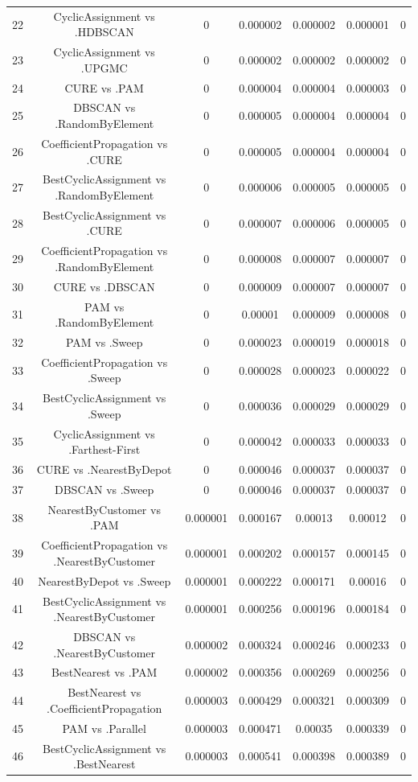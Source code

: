 \documentclass[a4paper,10pt]{article}
\begin{document}
\begin{landscape}
\begin{table}[!htp]
\begin{tabular}{ccccccc}
22&CyclicAssignment vs .HDBSCAN&0&0.000002&0.000002&0.000001&0\\
23&CyclicAssignment vs .UPGMC&0&0.000002&0.000002&0.000002&0\\
24&CURE vs .PAM&0&0.000004&0.000004&0.000003&0\\
25&DBSCAN vs .RandomByElement&0&0.000005&0.000004&0.000004&0\\
26&CoefficientPropagation vs .CURE&0&0.000005&0.000004&0.000004&0\\
27&BestCyclicAssignment vs .RandomByElement&0&0.000006&0.000005&0.000005&0\\
28&BestCyclicAssignment vs .CURE&0&0.000007&0.000006&0.000005&0\\
29&CoefficientPropagation vs .RandomByElement&0&0.000008&0.000007&0.000007&0\\
30&CURE vs .DBSCAN&0&0.000009&0.000007&0.000007&0\\
31&PAM vs .RandomByElement&0&0.00001&0.000009&0.000008&0\\
32&PAM vs .Sweep&0&0.000023&0.000019&0.000018&0\\
33&CoefficientPropagation vs .Sweep&0&0.000028&0.000023&0.000022&0\\
34&BestCyclicAssignment vs .Sweep&0&0.000036&0.000029&0.000029&0\\
35&CyclicAssignment vs .Farthest-First&0&0.000042&0.000033&0.000033&0\\
36&CURE vs .NearestByDepot&0&0.000046&0.000037&0.000037&0\\
37&DBSCAN vs .Sweep&0&0.000046&0.000037&0.000037&0\\
38&NearestByCustomer vs .PAM&0.000001&0.000167&0.00013&0.00012&0\\
39&CoefficientPropagation vs .NearestByCustomer&0.000001&0.000202&0.000157&0.000145&0\\
40&NearestByDepot vs .Sweep&0.000001&0.000222&0.000171&0.00016&0\\
41&BestCyclicAssignment vs .NearestByCustomer&0.000001&0.000256&0.000196&0.000184&0\\
42&DBSCAN vs .NearestByCustomer&0.000002&0.000324&0.000246&0.000233&0\\
43&BestNearest vs .PAM&0.000002&0.000356&0.000269&0.000256&0\\
44&BestNearest vs .CoefficientPropagation&0.000003&0.000429&0.000321&0.000309&0\\
45&PAM vs .Parallel&0.000003&0.000471&0.00035&0.000339&0\\
46&BestCyclicAssignment vs .BestNearest&0.000003&0.000541&0.000398&0.000389&0\\

\end{tabular}
\end{table}
\end{landscape}
\end{document}
